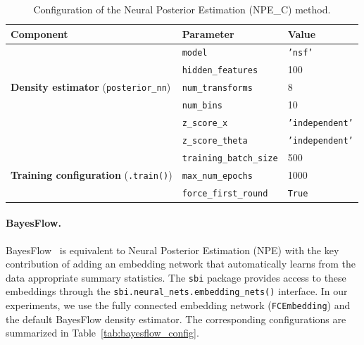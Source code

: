 \begin{table}[h!]
\centering
\caption{Configuration of the Neural Posterior Estimation (NPE\_C) method.}
\label{tab:npe_config}
\begin{tabular}{lll}
\toprule
\textbf{Component} & \textbf{Parameter} & \textbf{Value} \\
\midrule
\multirow{5}{*}{\textbf{Density estimator} (\texttt{posterior\_nn})}
 & \texttt{model} & \texttt{'nsf'} \\
 & \texttt{hidden\_features} & 100 \\
 & \texttt{num\_transforms} & 8 \\
 & \texttt{num\_bins} & 10 \\
 & \texttt{z\_score\_x} & \texttt{'independent'} \\
 & \texttt{z\_score\_theta} & \texttt{'independent'} \\
\midrule
\multirow{3}{*}{\textbf{Training configuration} (\texttt{.train()})}
 & \texttt{training\_batch\_size} & 500 \\
 & \texttt{max\_num\_epochs} & 1000 \\
 & \texttt{force\_first\_round} & \texttt{True} \\
\bottomrule
\end{tabular}
\end{table}

\paragraph{BayesFlow.}

BayesFlow~\citep{radev2020bayesflow} is equivalent to Neural Posterior Estimation (NPE) with the key contribution of adding an
embedding network that automatically learns from the data appropriate summary statistics.
The \texttt{sbi} package provides access to these embeddings through the \texttt{sbi.neural\_nets.embedding\_nets()} interface.
In our experiments, we use the fully connected embedding network (\texttt{FCEmbedding}) and the default BayesFlow density estimator. 
The corresponding configurations are summarized in Table~\ref{tab:bayesflow_config}.

